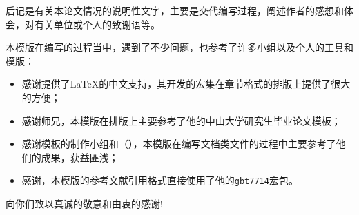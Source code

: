 \begin{acknowledgements}
    后记是有关本论文情况的说明性文字，主要是交代编写过程，阐述作者的感想和体会，对有关单位或个人的致谢语等。

    本模版在编写的过程当中，遇到了不少问题，也参考了许多小组以及个人的工具和模版：
    \begin{itemize}
        \item 感谢\href{https://github.com/CTeX-org/ctex-kit}{}提供了\LaTeX{}的中文支持，其开发的\href{https://ctan.org/tex-archive/language/chinese/ctex}{}宏集在章节格式的排版上提供了很大的方便；
        \item 感谢\href{https://www.zhihu.com/people/sgcd-33}{}师兄，本模版在排版上主要参考了他的中山大学研究生毕业论文模板\href{https://www.overleaf.com/latex/templates/zhong-shan-da-xue-yan-jiu-sheng-bi-ye-lun-wen-mo-ban-sysupalte/kybsnywqbcdc}{}；
        \item 感谢\href{https://github.com/sjtug/SJTUThesis}{}模板的制作小组和\href{https://github.com/nanmu42}{}（\href{https://github.com/nanmu42/CQUThesis}{}），本模版在编写文档类文件的过程中主要参考了他们的成果，获益匪浅；
        \item 感谢\href{https://github.com/zepinglee}{}，本模版的参考文献引用格式直接使用了他的\href{https://github.com/zepinglee/gbt7714-bibtex-style}{\texttt{gbt7714}}宏包。
    \end{itemize}
    向你们致以真诚的敬意和由衷的感谢!
\end{acknowledgements}
